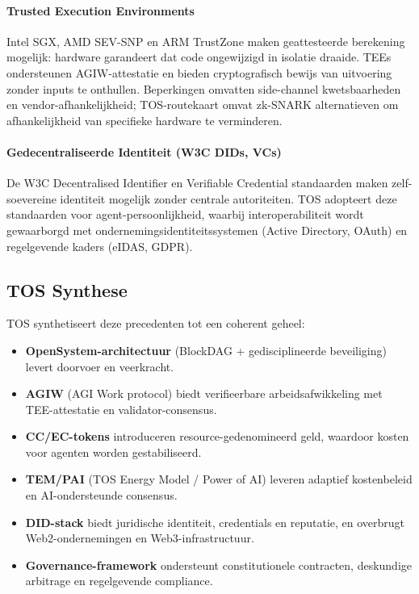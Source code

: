 \documentclass[11pt]{article}
\begin{document}
\paragraph{Trusted Execution Environments} Intel SGX, AMD SEV-SNP en ARM TrustZone maken geattesteerde berekening mogelijk: hardware garandeert dat code ongewijzigd in isolatie draaide. TEEs ondersteunen AGIW-attestatie en bieden cryptografisch bewijs van uitvoering zonder inputs te onthullen. Beperkingen omvatten side-channel kwetsbaarheden en vendor-afhankelijkheid; TOS-routekaart omvat zk-SNARK alternatieven om afhankelijkheid van specifieke hardware te verminderen.

\paragraph{Gedecentraliseerde Identiteit (W3C DIDs, VCs)} De W3C Decentralised Identifier en Verifiable Credential standaarden maken zelf-soevereine identiteit mogelijk zonder centrale autoriteiten. TOS adopteert deze standaarden voor agent-persoonlijkheid, waarbij interoperabiliteit wordt gewaarborgd met ondernemingsidentiteitssystemen (Active Directory, OAuth) en regelgevende kaders (eIDAS, GDPR).

\subsection{TOS Synthese}
TOS synthetiseert deze precedenten tot een coherent geheel:
\begin{itemize}[noitemsep]
  \item \textbf{OpenSystem-architectuur} (BlockDAG + gedisciplineerde beveiliging) levert doorvoer en veerkracht.
  \item \textbf{AGIW} (AGI Work protocol) biedt verifieerbare arbeidsafwikkeling met TEE-attestatie en validator-consensus.
  \item \textbf{CC/EC-tokens} introduceren resource-gedenomineerd geld, waardoor kosten voor agenten worden gestabiliseerd.
  \item \textbf{TEM/PAI} (TOS Energy Model / Power of AI) leveren adaptief kostenbeleid en AI-ondersteunde consensus.
  \item \textbf{DID-stack} biedt juridische identiteit, credentials en reputatie, en overbrugt Web2-ondernemingen en Web3-infrastructuur.
  \item \textbf{Governance-framework} ondersteunt constitutionele contracten, deskundige arbitrage en regelgevende compliance.
\end{itemize}
\end{document}
